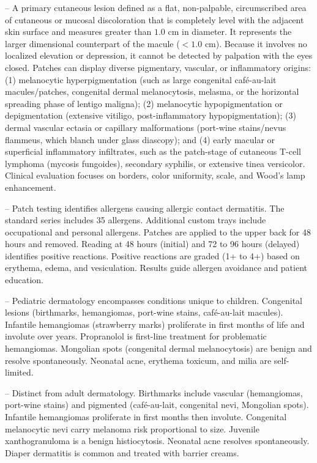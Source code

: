 -- A primary cutaneous lesion defined as a flat, non-palpable, circumscribed area of cutaneous or mucosal discoloration that is completely level with the adjacent skin surface and measures greater than $1.0\text{ cm}$ in diameter. It represents the larger dimensional counterpart of the macule ($<1.0\text{ cm}$). Because it involves no localized elevation or depression, it cannot be detected by palpation with the eyes closed. Patches can display diverse pigmentary, vascular, or inflammatory origins: (1) melanocytic hyperpigmentation (such as large congenital café-au-lait macules/patches, congenital dermal melanocytosis, melasma, or the horizontal spreading phase of lentigo maligna); (2) melanocytic hypopigmentation or depigmentation (extensive vitiligo, post-inflammatory hypopigmentation); (3) dermal vascular ectasia or capillary malformations (port-wine stains/nevus flammeus, which blanch under glass diascopy); and (4) early macular or superficial inflammatory infiltrates, such as the patch-stage of cutaneous T-cell lymphoma (mycosis fungoides), secondary syphilis, or extensive tinea versicolor. Clinical evaluation focuses on borders, color uniformity, scale, and Wood's lamp enhancement.

-- Patch testing identifies allergens causing allergic contact dermatitis. The standard series includes 35 allergens. Additional custom trays include occupational and personal allergens. Patches are applied to the upper back for 48 hours and removed. Reading at 48 hours (initial) and 72 to 96 hours (delayed) identifies positive reactions. Positive reactions are graded (1+ to 4+) based on erythema, edema, and vesiculation. Results guide allergen avoidance and patient education.

-- Pediatric dermatology encompasses conditions unique to children. Congenital lesions (birthmarks, hemangiomas, port-wine stains, café-au-lait macules). Infantile hemangiomas (strawberry marks) proliferate in first months of life and involute over years. Propranolol is first-line treatment for problematic hemangiomas. Mongolian spots (congenital dermal melanocytosis) are benign and resolve spontaneously. Neonatal acne, erythema toxicum, and milia are self-limited.

-- Distinct from adult dermatology. Birthmarks include vascular (hemangiomas, port-wine stains) and pigmented (café-au-lait, congenital nevi, Mongolian spots). Infantile hemangiomas proliferate in first months then involute. Congenital melanocytic nevi carry melanoma risk proportional to size. Juvenile xanthogranuloma is a benign histiocytosis. Neonatal acne resolves spontaneously. Diaper dermatitis is common and treated with barrier creams.

